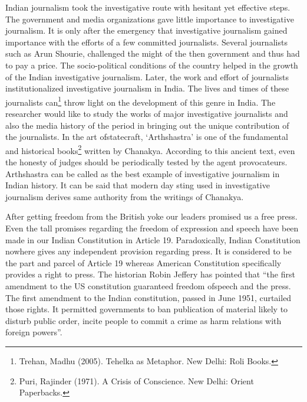 \setcounter{figure}{0}
\setcounter{table}{0}
\setcounter{footnote}{0}

\label{2017-art6}

\begin{multicols}{2}


\noi
Indian journalism took the investigative route with hesitant yet effective steps. The government
and media organizations gave little importance to investigative journalism. It is only after the
emergency that investigative journalism gained importance with the efforts of a few committed
journalists. Several journalists such as Arun Shourie, challenged the might of the then
government and thus had to pay a price. The socio-political conditions of the country helped in
the growth of the Indian investigative journalism. Later, the work and effort of journalists
institutionalized investigative journalism in India. The lives and times of these journalists can\footnote{Trehan, Madhu (2005). Tehelka as Metaphor. New Delhi: Roli Books.}
throw light on the development of this genre in India. The researcher would like to study the
works of major investigative journalists and also the media history of the period in bringing
out the unique contribution of the journalists. In the art ofstatecraft, ‘Arthshastra’ is one of the
fundamental and historical books\footnote{Puri, Rajinder (1971). A Crisis of Conscience. New Delhi: Orient Paperbacks.} written by Chanakya. According to this ancient text, even
the honesty of judges should be periodically tested by the agent provocateurs. Arthshastra can
be called as the best example of investigative journalism in Indian history. It can be said that
modern day sting used in investigative journalism derives same authority from the writings of
Chanakya.

\vspace{-.1cm}

\noi
After getting freedom from the British yoke our leaders promised us a free press. Even the tall
promises regarding the freedom of expression and speech have been made in our Indian
Constitution in Article 19. Paradoxically, Indian Constitution nowhere gives any independent
provision regarding press. It is considered to be the part and parcel of Article 19 whereas
American Constitution specifically provides a right to press. The historian Robin Jeffery has
pointed that “the first amendment to the US constitution guaranteed freedom ofspeech and the
press. The first amendment to the Indian constitution, passed in June 1951, curtailed those
rights. It permitted governments to ban publication of material likely to disturb public order,
incite people to commit a crime as harm relations with foreign powers”.


\end{multicols}
